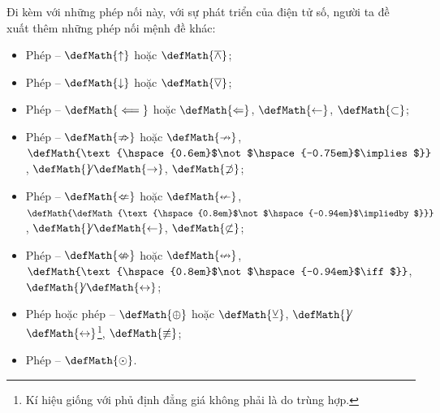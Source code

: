 Đi kèm với những phép nối này, với sự phát triển của điện tử số, người ta đề xuất thêm những phép nối mệnh đề khác:
\begin{itemize}
   \item Phép  -- $\defMath{\uparrow}$ hoặc $\defMath{\overline{\land}}$;
   \item Phép  -- $\defMath{\downarrow}$ hoặc $\defMath{\overline{\lor}}$; 
   \item Phép  -- $\defMath{\impliedby}$ hoặc $\defMath{\Leftarrow}$, $\defMath{\leftarrow}$, $\defMath{\subset}$;
   \item Phép  -- $\defMath{\nRightarrow}$ hoặc $\defMath{\nrightarrow}$, $\defMath{\text{\hspace{0.6em}$\not$\hspace{-0.75em}$\implies$}}$, \hspace{0.1em}$\defMath{\not}$\hspace{-0.1em}$\defMath{\rightarrow}$, $\defMath{\not\supset}$;
   \item Phép  -- $\defMath{\nLeftarrow}$ hoặc $\defMath{\nleftarrow}$, $\defMath{\defMath{\text{\hspace{0.8em}$\not$\hspace{-0.94em}$\impliedby$}}}$, \hspace{0.2em}$\defMath{\not}$\hspace{-0.2em}$\defMath{\leftarrow}$, $\defMath{\not\subset}$;
   \item Phép  -- $\defMath{\nLeftrightarrow}$ hoặc $\defMath{\nleftrightarrow}$, $\defMath{\text{\hspace{0.8em}$\not$\hspace{-0.94em}$\iff$}}$, \hspace{0.13em}$\defMath{\not}$\hspace{-0.13em}$\defMath{\leftrightarrow}$; 
   \item Phép  hoặc phép  -- $\defMath{\oplus}$ hoặc $\defMath{\veebar}$, \hspace{0.13em}$\defMath{\not}$\hspace{-0.13em}$\defMath{\leftrightarrow}$\footnote{Kí hiệu giống với phủ định đẳng giá không phải là do trùng hợp.}, $\defMath{\not\equiv}$;
   \item Phép  -- $\defMath{\odot}$.
\end{itemize}

